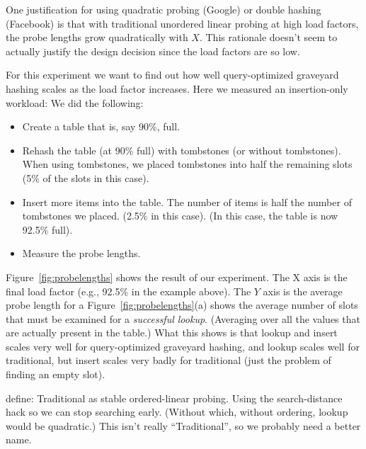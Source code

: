 \documentclass[10pt]{article}
\theoremstyle{remark}
\theoremstyle{remark}
\newcommand{\figref}[1]{Figure~\ref{fig:#1}}
\begin{document}
One justification for using quadratic probing (Google) or double
hashing (Facebook) is that with traditional unordered linear probing
at high load factors, the probe lengths grow quadratically with $X$.
This rationale doesn't seem to actually justify the design decision
since the load factors are so low.

For this experiment we want to find out how well query-optimized
graveyard hashing scales as the load factor increases.  Here we
measured an insertion-only workload: We did the following:
\begin{itemize}
\item Create a table that is, say 90\%, full.
\item Rehash the table (at 90\% full) with tombstones (or without
  tombstones).  When using tombstones, we placed tombstones into half
  the remaining slots (5\% of the slots in this case).
\item Insert more items into the table.  The number of items is half
  the number of tombstones we placed.  (2.5\% in this case).  (In this
  case, the table is now 92.5\% full).
\item Measure the probe lengths.
\end{itemize}

\figref{probelengths} shows the result of our experiment.
The X axis is the final load factor (e.g., 92.5\% in the example above).  The $Y$ axis is the average probe length for a 
\figref{probelengths}(a) shows the average number of slots that must be
examined for a \textit{successful lookup}.  (Averaging over all the
values that are actually present in the table.)  What this shows is that lookup and insert scales very well for query-optimized graveyard hashing, and lookup scales well for traditional, but insert scales very badly for traditional (just the problem of finding an empty slot).

define: Traditional as stable ordered-linear probing.  Using the
search-distance hack so we can stop searching early.  (Without which,
without ordering, lookup would be quadratic.)  This isn't really
``Traditional'', so we probably need a better name.
\end{document}
